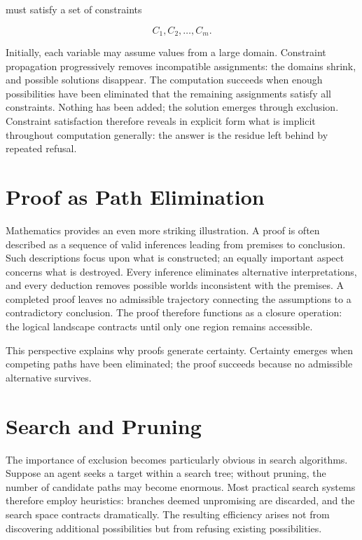 \documentclass[11pt,oneside]{book}
\theoremstyle{plain}
\theoremstyle{definition}
\theoremstyle{remark}
\begin{document}
must satisfy a set of constraints

\begin{equation}
C_1,C_2,\ldots,C_m.
\end{equation}

Initially, each variable may assume values from a large domain. Constraint propagation progressively removes incompatible assignments: the domains shrink, and possible solutions disappear. The computation succeeds when enough possibilities have been eliminated that the remaining assignments satisfy all constraints. Nothing has been added; the solution emerges through exclusion. Constraint satisfaction therefore reveals in explicit form what is implicit throughout computation generally: the answer is the residue left behind by repeated refusal.

\section{Proof as Path Elimination}

Mathematics provides an even more striking illustration. A proof is often described as a sequence of valid inferences leading from premises to conclusion. Such descriptions focus upon what is constructed; an equally important aspect concerns what is destroyed. Every inference eliminates alternative interpretations, and every deduction removes possible worlds inconsistent with the premises. A completed proof leaves no admissible trajectory connecting the assumptions to a contradictory conclusion. The proof therefore functions as a closure operation: the logical landscape contracts until only one region remains accessible.

This perspective explains why proofs generate certainty. Certainty emerges when competing paths have been eliminated; the proof succeeds because no admissible alternative survives.

\section{Search and Pruning}

The importance of exclusion becomes particularly obvious in search algorithms. Suppose an agent seeks a target within a search tree; without pruning, the number of candidate paths may become enormous. Most practical search systems therefore employ heuristics: branches deemed unpromising are discarded, and the search space contracts dramatically. The resulting efficiency arises not from discovering additional possibilities but from refusing existing possibilities.
\end{document}
